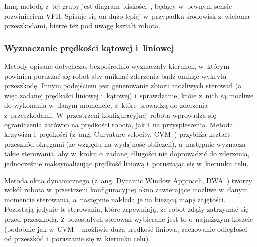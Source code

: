 Inną metodą z~tej grupy jest diagram bliskości~\cite{minguez2004nearness}, będący
w~pewnym sensie rozwinięciem VFH.
Spisuje się on dużo lepiej w~przypadku środowisk z~wieloma przeszkodami, bierze też
pod uwagę kształt robota.

\subsubsection{Wyznaczanie prędkości kątowej i~liniowej}

Metody opisane dotychczas bezpośrednio wyznaczały kierunek, w~którym powinien poruszać
się robot aby uniknąć zderzenia bądź ominąć wykrytą przeszkodę. Innym podejściem
jest generowanie zbioru możliwych sterowań (a więc zadanej prędkości liniowej i~kątowej)
i~sprawdzanie, które z~nich są możliwe do wykonania w~danym momencie, a~które prowadzą
do zderzenia z~przeszkodami. W~przestrzeni konfiguracyjnej robota wprowadza się ograniczenia
zarówno na prędkości robota, jak i~na przyspieszenia. Metoda krzywizn i~prędkości
(z~ang. Curvature velocity, CVM~\cite{511023}) przybliża kształt przeszkód okręgami (ze względu na wydajność
obliczeń), a~następnie wyznacza takie sterowania, aby w~kroku o~zadanej długości
nie doprowadzić do zderzenia, jednocześnie maksymalizując prędkość liniową i~poruszając
się w~kierunku celu.

Metoda okna dynamicznego (z~ang. Dynamic Window Approach, DWA~\cite{fox1997dynamic}) tworzy wokół robota w~przestrzeni
konfiguracyjnej okno zawierające możliwe w~danym momencie sterowania, a~następnie nakłada
je na bieżącą mapę zajętości. Pozostają jedynie te sterowania, które zapewniają,
że robot zdąży zatrzymać się przed przeszkodą. Z pozostałych sterowań wybierane jest
to o~najniższym koszcie (podobnie jak w~CVM -- możliwie duża prędkość liniowa,
zachowanie odległości od przeszkód i~poruszanie się w~kierunku celu).
